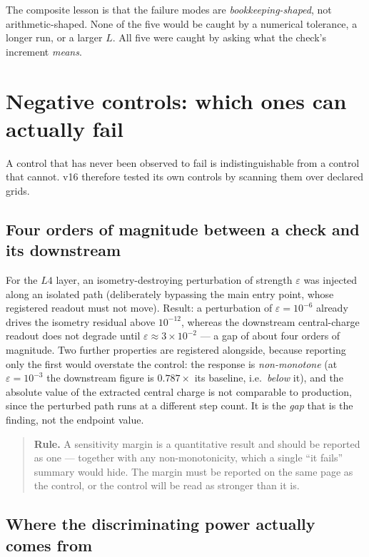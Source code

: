 \documentclass[11pt,a4paper]{article}
\begin{document}
The composite lesson is that the failure modes are \emph{bookkeeping-shaped},
not arithmetic-shaped. None of the five would be caught by a numerical
tolerance, a longer run, or a larger $L$. All five were caught by asking what
the check's increment \emph{means}.

\section{Negative controls: which ones can actually fail}
\label{sec:controls}

A control that has never been observed to fail is indistinguishable from a
control that cannot. v16 therefore tested its own controls by scanning them over
declared grids.

\subsection{Four orders of magnitude between a check and its downstream}

For the $L4$ layer, an isometry-destroying perturbation of strength $\varepsilon$
was injected along an isolated path (deliberately bypassing the main entry
point, whose registered readout must not move). Result: a perturbation of
$\varepsilon = 10^{-6}$ already drives the isometry residual above $10^{-12}$,
whereas the downstream central-charge readout does not degrade until
$\varepsilon \approx 3\times10^{-2}$ --- a gap of about four orders of
magnitude. Two further properties are registered alongside, because reporting
only the first would overstate the control: the response is \emph{non-monotone}
(at $\varepsilon = 10^{-3}$ the downstream figure is $0.787\times$ its baseline,
i.e.\ \emph{below} it), and the absolute value of the extracted central charge is
not comparable to production, since the perturbed path runs at a different step
count. It is the \emph{gap} that is the finding, not the endpoint value.

\begin{quote}\small
\textbf{Rule.} A sensitivity margin is a quantitative result and should be
reported as one --- together with any non-monotonicity, which a single ``it
fails'' summary would hide. The margin must be reported on the same page as the
control, or the control will be read as stronger than it is.
\end{quote}

\subsection{Where the discriminating power actually comes from}
\end{document}
